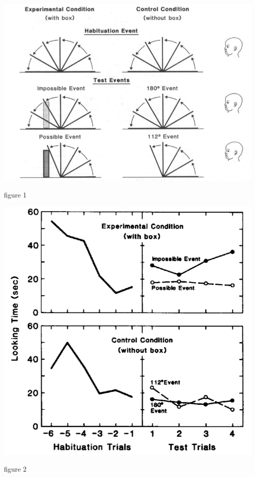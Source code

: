 \documentclass[12pt]{extarticle}
\begin{document}
\begin{multicols}{3}
\begin{center}
\includegraphics[scale=0.3]{img/baillargeon_1987_fig1.neg.png}
\end{center}
\begin{center} \citealp{baillargeon:1987_object} figure 1 \end{center}
 
\begin{center}
\includegraphics[scale=0.3]{img/baillargeon_1987_fig2.neg.png}
\end{center}
\begin{center} \citealp{baillargeon:1987_object} figure 2 \end{center}
 

\end{multicols}
\end{document}

